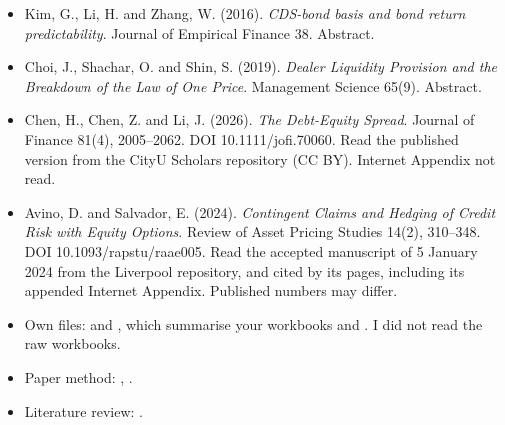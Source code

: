 \documentclass[10pt,a4paper]{article}
\begin{document}
\begin{itemize}[nosep]
\item Kim, G., Li, H. and Zhang, W. (2016). \emph{CDS-bond basis and bond return predictability}. Journal of Empirical Finance 38. Abstract.
\item Choi, J., Shachar, O. and Shin, S. (2019). \emph{Dealer Liquidity Provision and the Breakdown of the Law of One Price}. Management Science 65(9). Abstract.
\item Chen, H., Chen, Z. and Li, J. (2026). \emph{The Debt-Equity Spread}. Journal of Finance 81(4), 2005--2062. DOI 10.1111/jofi.70060. Read the published version from the CityU Scholars repository (CC BY). Internet Appendix not read.
\item Avino, D. and Salvador, E. (2024). \emph{Contingent Claims and Hedging of Credit Risk with Equity Options}. Review of Asset Pricing Studies 14(2), 310--348. DOI 10.1093/rapstu/raae005. Read the accepted manuscript of 5 January 2024 from the Liverpool repository, and cited by its pages, including its appended Internet Appendix. Published numbers may differ.
\item Own files:  and , which summarise your workbooks and . I did not read the raw workbooks.
\item Paper method: , .
\item Literature review: .
\end{itemize}
\end{document}
